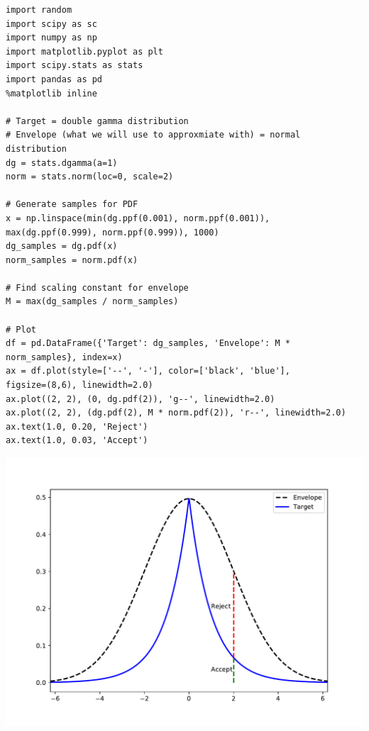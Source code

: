 \documentclass{article}
\begin{document}
\begin{lstlisting}
import random
import scipy as sc
import numpy as np
import matplotlib.pyplot as plt
import scipy.stats as stats
import pandas as pd
%matplotlib inline

# Target = double gamma distribution
# Envelope (what we will use to approxmiate with) = normal distribution 
dg = stats.dgamma(a=1)
norm = stats.norm(loc=0, scale=2)

# Generate samples for PDF
x = np.linspace(min(dg.ppf(0.001), norm.ppf(0.001)), 
max(dg.ppf(0.999), norm.ppf(0.999)), 1000)
dg_samples = dg.pdf(x)
norm_samples = norm.pdf(x)

# Find scaling constant for envelope 
M = max(dg_samples / norm_samples)

# Plot
df = pd.DataFrame({'Target': dg_samples, 'Envelope': M * norm_samples}, index=x)
ax = df.plot(style=['--', '-'], color=['black', 'blue'], 
figsize=(8,6), linewidth=2.0)
ax.plot((2, 2), (0, dg.pdf(2)), 'g--', linewidth=2.0)
ax.plot((2, 2), (dg.pdf(2), M * norm.pdf(2)), 'r--', linewidth=2.0)
ax.text(1.0, 0.20, 'Reject')
ax.text(1.0, 0.03, 'Accept')

\end{lstlisting}
\includegraphics[scale=0.5]{fig1.pdf}
\end{document}
